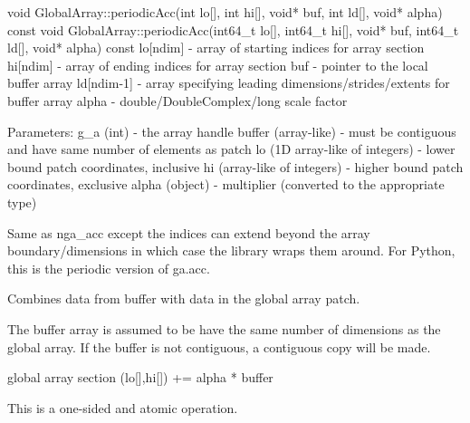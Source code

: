\documentclass[12pt]{article}
\begin{document}
\begin{cxxapi}
void GlobalArray::periodicAcc(int lo[], int hi[], void* buf,
                              int ld[], void* alpha) const
void GlobalArray::periodicAcc(int64_t lo[], int64_t hi[], void* buf,
                              int64_t ld[], void* alpha) const
   lo[ndim]   - array of starting indices for array section               \access{[input]}
   hi[ndim]   - array of ending indices for array section                 \access{[input]}
   buf        - pointer to the local buffer array                         \access{[input]}
   ld[ndim-1] - array specifying leading dimensions/strides/extents
                for buffer array                                          \access{[input]}
   alpha      - double/DoubleComplex/long scale factor                    \access{[input]}
\end{cxxapi}

\begin{pyapi}
Parameters:
   g_a (int) - the array handle
   buffer (array-like)            - must be contiguous and have same 
                                    number of elements as patch
   lo (1D array-like of integers) - lower bound patch coordinates, inclusive
   hi (array-like of integers)    - higher bound patch coordinates, exclusive
   alpha (object)                 - multiplier (converted to the appropriate type)
\end{pyapi}

\begin{desc}

Same as nga_acc except the indices can extend beyond the array boundary/dimensions in which case the library wraps them around. For Python, this is the periodic version of ga.acc.

Combines data from buffer with data in the global array patch.

The buffer array is assumed to be have the same number of dimensions as the global array. If the buffer is not contiguous, a contiguous copy will be made.

global array section (lo[],hi[]) += alpha * buffer

This is a one-sided and atomic operation.

\end{desc}

\end{document}
